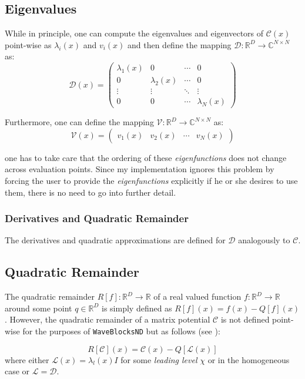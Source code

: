\subsection{Eigenvalues}
While in principle, one can compute the eigenvalues and eigenvectors of $\mathcal{C}(x)$ point-wise as $\lambda_i(x)$ and $v_i(x)$ and then define the mapping
$\mathcal{D} : \mathbb{R}^D \rightarrow \mathbb{C}^{N\times N}$ as:
\begin{equation}
\mathcal{D}(x) = \begin{pmatrix}
  \lambda_1(x) & 0 & \cdots & 0 \\
  0& \lambda_2(x) & \cdots & 0 \\
  \vdots  & \vdots  & \ddots & \vdots  \\
  0 & 0 & \cdots & \lambda_N(x)
 \end{pmatrix}
 \label{eqn:diag}
\end{equation}

Furthermore, one can define the mapping $\mathcal{V} : \mathbb{R}^D \rightarrow \mathbb{C}^{N \times N}$ as:
\begin{equation}
\mathcal{V}(x) = \begin{pmatrix}
  v_1(x) & v_2(x) & \cdots & v_N(x)
 \end{pmatrix}
 \label{eqn:eigenTransform}
\end{equation}

one has to take care that the ordering of these \textit{eigenfunctions} does not change across evaluation points.
Since my implementation ignores this problem by forcing the user to provide the \textit{eigenfunctions} explicitly if he or she desires to use them, there is no need to go into further detail.

\subsubsection{Derivatives and Quadratic Remainder}
The derivatives and quadratic approximations are defined for $\mathcal{D}$ analogously to $\mathcal{C}$.

\subsection{Quadratic Remainder}
The quadratic remainder $R[f]: \mathbb{R}^D \rightarrow \mathbb{R}$ of a real valued function $f: \mathbb{R}^D \rightarrow \mathbb{R}$ around some point $q \in \mathbb{R}^D$ is simply defined as $R[f](x) = f(x) - Q[f](x)$.
However, the quadratic remainder of a matrix potential $\mathcal{C}$ is not defined point-wise for the purposes of \texttt{WaveBlocksND} but as follows (see \cite{B_master_thesis}):

\begin{equation}
R[\mathcal{C}](x) = \mathcal{C}(x) - Q[\mathcal{L}(x)]
\label{eqn:quadRemainder}
\end{equation}
where either $\mathcal{L}(x) = \lambda_l(x)I$ for some \textit{leading level} $\chi$ or in the homogeneous case or $\mathcal{L} = \mathcal{D}$.



